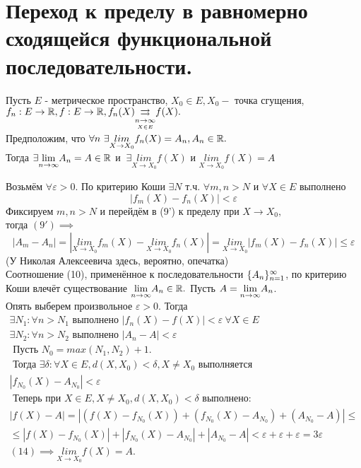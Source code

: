\documentclass[main]{subfiles}
\begin{document}
\section{Переход к пределу в равномерно сходящейся функциональной последовательности.}
\begin{theorem}
     Пусть $E$ - метрическое пространство, $X_0\in E, X_0 - $ точка сгущения,
      $f_n:E\to{\vR}, f:E\to{\vR}, f_n(X){\darrow{\underset{X\in E}{n\to\infty}}}  
      f(X).$\\ Предположим, что $\forall n\ \exists\underset{X\to X_0}{lim}f_n(X)=A_n, A_n\in{\vR}.$\\
       Тогда $\exists\Lim A_n=A\in{\vR}$ и $\ \exists\underset{X\to X_0}{lim}f(X)$ 
       и $\underset{X\to X_0}{lim}f(X)=A$ \end{theorem}
\begin{longProof}
     Возьмём $\forall\varepsilon>0.$ По критерию Коши $\exists N$ т.ч. $\forall m, n>N$ и $\forall X\in E$
      выполнено
       \[|f_m(X)-f_n(X)|<\varepsilon\tag{9'} \]
        Фиксируем $m,n>N$ и перейдём 
      в (9') к пределу при $X\to X_0,$\\ тогда $(9') \implies$
\[ |A_m-A_n|=|\underset{X\to X_0}{lim} f_m(X)-\underset{X\to X_0}{lim} f_n(X)|=\underset{X\to X_0}{lim} |f_m(X)-f_n(X)|\leq \varepsilon\tag{10} \] (У Николая Алексеевича здесь, вероятно, опечатка)\\
Соотношение (10), применённое к последовательности $\fnn[A_n]$, по критерию Коши влечёт существование $\Lim A_n\in{\vR}.$ Пусть $A=\Lim A_n$.\\
Опять выберем произвольное $\varepsilon>0.$ Тогда
\begin{gather*}
\exists N_1: \forall n>N_1 \text{ выполнено } |f_n(X)-f(X)|<\varepsilon\ \forall X\in E\tag{11} \\
\exists N_2: \forall n>N_2 \text{ выполнено } |A_n-A|<\varepsilon \tag{12} \\
\text{ Пусть } N_0=max(N_1,N_2)+1.\\
 \text{ Тогда } \exists\delta: \forall X\in E, d(X,X_0)<\delta, X\neq X_0 \text{ выполняется} \\
|f_{N_0}(X)-A_{N_0}|<\varepsilon\tag{13} \\
\text{ Теперь при } X\in E, X\neq X_0, d(X,X_0)<\delta \text{ выполнено}: \\
|f(X)-A|=|(f(X)-f_{N_0}(X))+(f_{N_0}(X)-A_{N_0})+(A_{N_0}-A)|\leq \\
 \leq |f(X)-f_{N_0}(X)|+|f_{N_0}(X)-A_{N_0}|+|A_{N_0}-A|<\varepsilon+\varepsilon+\varepsilon=3\varepsilon\tag{14} \\
 (14) \implies \underset{X\to X_0}{lim}{f(X)}=A. \end{gather*}
\end{longProof}
\end{document}
